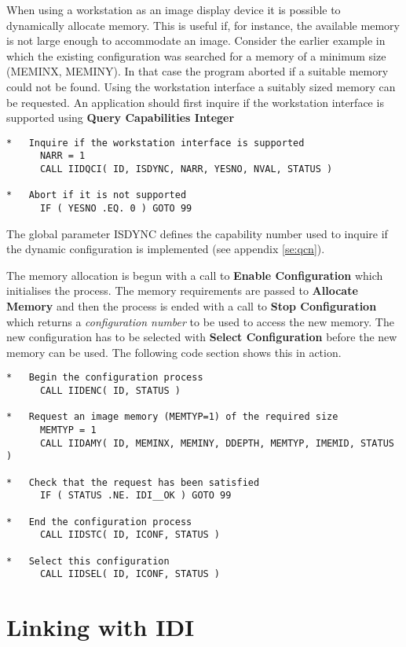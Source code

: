 When using a workstation as an image display device it is possible to
dynamically allocate memory. This is useful if, for instance, the
available memory is not large enough to accommodate an image. Consider
the earlier example in which the existing configuration was searched
for a memory of a minimum size (MEMINX, MEMINY). In that case the
program aborted if a suitable memory could not be found. Using the
workstation interface a suitably sized memory can be requested. An
application should first inquire if the workstation interface is
supported using {\bf Query Capabilities Integer}
\begin{small}
\begin{verbatim}
*   Inquire if the workstation interface is supported
      NARR = 1
      CALL IIDQCI( ID, ISDYNC, NARR, YESNO, NVAL, STATUS )

*   Abort if it is not supported
      IF ( YESNO .EQ. 0 ) GOTO 99
\end{verbatim}
\end{small}
The global parameter ISDYNC defines the capability number used to inquire
if the dynamic configuration is implemented (see appendix \ref{se:qcn}).

The memory allocation is begun with a call to {\bf Enable Configuration}
which initialises the process. The memory requirements are passed to
{\bf Allocate Memory} and then the process is ended with a call to
{\bf Stop Configuration} which returns a {\it configuration number} to
be used to access the new memory. The new configuration has to be
selected with {\bf Select Configuration} before the new memory can
be used. The following code section shows this in action.
\begin{small}
\begin{verbatim}
*   Begin the configuration process
      CALL IIDENC( ID, STATUS )

*   Request an image memory (MEMTYP=1) of the required size
      MEMTYP = 1
      CALL IIDAMY( ID, MEMINX, MEMINY, DDEPTH, MEMTYP, IMEMID, STATUS )

*   Check that the request has been satisfied
      IF ( STATUS .NE. IDI__OK ) GOTO 99

*   End the configuration process
      CALL IIDSTC( ID, ICONF, STATUS )

*   Select this configuration
      CALL IIDSEL( ID, ICONF, STATUS )
\end{verbatim}
\end{small}

\newpage
\section{Linking with IDI}


